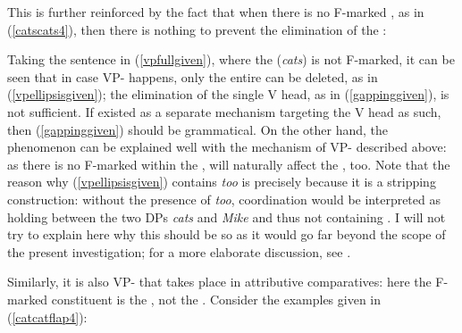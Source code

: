This is further reinforced by the fact that when there is no F-marked , as in (\ref{catscats4}), then there is nothing to prevent the elimination of the :

\ea \label{catscats4}
 \label{vpfullgiven}
 \label{gappinggiven}
 \label{vpellipsisgiven}
\z
\z

Taking the sentence in (\ref{vpfullgiven}), where the  (\textit{cats}) is not F-marked, it can be seen that in case VP- happens, only the entire  can be deleted, as in (\ref{vpellipsisgiven}); the elimination of the single V head, as in (\ref{gappinggiven}), is not sufficient. If   existed as a separate mechanism targeting the V head as such, then (\ref{gappinggiven}) should be grammatical. On the other hand, the phenomenon can be explained well with the mechanism of VP- described above: as there is no F-marked  within the ,  will naturally affect the , too. Note that the reason why (\ref{vpellipsisgiven}) contains \textit{too} is precisely because it is a stripping construction: without the presence of \textit{too}, coordination would be interpreted as holding between the two DPs \textit{cats} and \textit{Mike} and thus not containing . I will not try to explain here why this should be so as it would go far beyond the scope of the present investigation; for a more elaborate discussion, see \citet{vicente2010}.

Similarly, it is also VP- that takes place in attributive comparatives: here the F-marked constituent is the , not the . Consider the examples given in (\ref{catcatflap4}):

\ea \label{catcatflap4}
 \label{acdfull}
 \label{acdverb}
 \label{acdcorrect}
 \label{acdvp}
\z
\z

